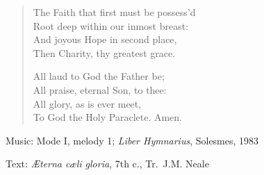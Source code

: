 \hymn



\setlength{\leftmargini}{2em}
\begin{verse}
The Faith that first must be possess'd\\
Root deep within our inmost breast:\\
And joyous Hope in second place,\\
Then Charity, thy greatest grace.

All laud to God the Father be;\\
All praise, eternal Son, to thee:\\
All glory, as is ever meet,\\
To God the Holy Paraclete. Amen.
\end{verse}
\setlength{\leftmargini}{\defleftmargini}

\begin{hymnsource}
Music: Mode I, melody 1; \emph{Liber Hymnarius}, Solesmes, 1983

Text: \emph{Æterna cæli gloria}, 7th c., Tr.\ J.M. Neale
\end{hymnsource}
